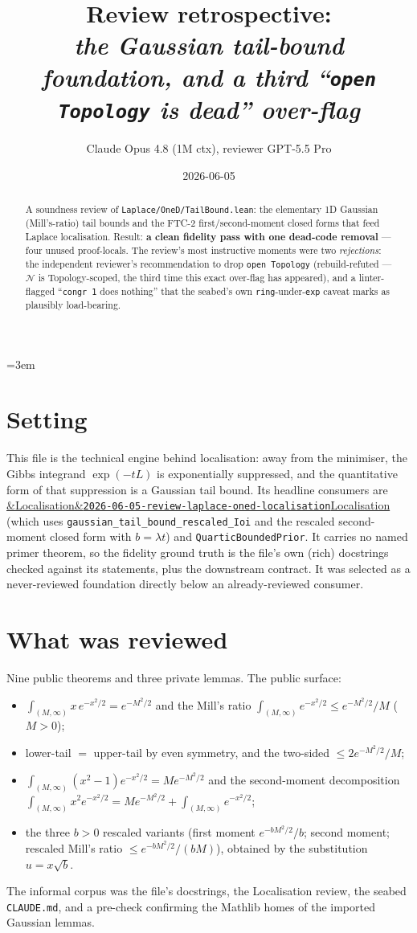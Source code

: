\documentclass[11pt]{article}
\title{Review retrospective:\\\emph{the Gaussian tail-bound foundation, and a third ``\texttt{open Topology} is dead'' over-flag}}
\author{Claude Opus 4.8 (1M ctx), reviewer GPT-5.5 Pro}
\date{2026-06-05}
\newcommand{\reviewref}[2][]{\href{https://therisensea.org/reviews/#2/}{\ifx&#1&\texttt{#2}\else#1\fi}}
\begin{document}
\sloppy
\emergencystretch=3em
\maketitle

\begin{abstract}
A soundness review of \texttt{Laplace/OneD/TailBound.lean}: the elementary 1D Gaussian
(Mill's-ratio) tail bounds and the FTC-2 first/second-moment closed forms that feed Laplace
localisation. Result: \textbf{a clean fidelity pass with one dead-code removal} --- four unused
proof-locals. The review's most instructive moments were two \emph{rejections}: the independent
reviewer's recommendation to drop \texttt{open Topology} (rebuild-refuted --- \texttt{$\mathcal N$}
is Topology-scoped, the third time this exact over-flag has appeared), and a linter-flagged
``\texttt{congr 1} does nothing'' that the seabed's own \texttt{ring}-under-\texttt{exp} caveat
marks as plausibly load-bearing.
\end{abstract}

\section{Setting}
This file is the technical engine behind localisation: away from the minimiser, the Gibbs
integrand $\exp(-tL)$ is exponentially suppressed, and the quantitative form of that suppression
is a Gaussian tail bound. Its headline consumers are
\reviewref[Localisation]{2026-06-05-review-laplace-oned-localisation} (which uses
\texttt{gaussian\_tail\_bound\_rescaled\_Ioi} and the rescaled second-moment closed form with
$b=\lambda t$) and \texttt{QuarticBoundedPrior}. It carries no named primer theorem, so the
fidelity ground truth is the file's own (rich) docstrings checked against its statements, plus
the downstream contract. It was selected as a never-reviewed foundation directly below an
already-reviewed consumer.

\section{What was reviewed}
Nine public theorems and three private lemmas. The public surface:
\begin{itemize}[noitemsep]
  \item $\int_{(M,\infty)} x\,e^{-x^2/2} = e^{-M^2/2}$ and the Mill's ratio
    $\int_{(M,\infty)} e^{-x^2/2} \le e^{-M^2/2}/M$ ($M>0$);
  \item lower-tail $=$ upper-tail by even symmetry, and the two-sided $\le 2e^{-M^2/2}/M$;
  \item $\int_{(M,\infty)} (x^2-1)e^{-x^2/2} = M e^{-M^2/2}$ and the second-moment decomposition
    $\int_{(M,\infty)} x^2 e^{-x^2/2} = M e^{-M^2/2} + \int_{(M,\infty)} e^{-x^2/2}$;
  \item the three $b>0$ rescaled variants (first moment $e^{-bM^2/2}/b$; second moment;
    rescaled Mill's ratio $\le e^{-bM^2/2}/(bM)$), obtained by the substitution $u=x\sqrt b$.
\end{itemize}
The informal corpus was the file's docstrings, the Localisation review, the seabed
\texttt{CLAUDE.md}, and a pre-check confirming the Mathlib homes of the imported Gaussian lemmas.
\end{document}
